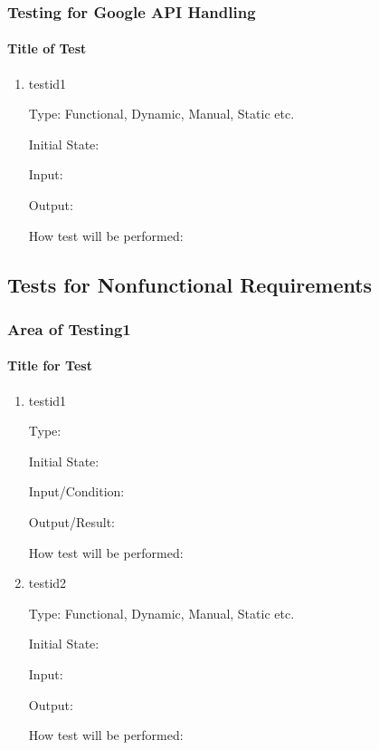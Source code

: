 \documentclass[12pt, titlepage]{article}
\begin{document}
\subsubsection{Testing for Google API Handling}

\paragraph{Title of Test}

\begin{enumerate}

\item{testid1\\}

Type: Functional, Dynamic, Manual, Static etc.
					
Initial State: 
					
Input: 
					
Output: 
					
How test will be performed: 
\end{enumerate}


\subsection{Tests for Nonfunctional Requirements}

\subsubsection{Area of Testing1}
		
\paragraph{Title for Test}

\begin{enumerate}

\item{testid1\\}

Type: 
					
Initial State: 
					
Input/Condition: 
					
Output/Result: 
					
How test will be performed: 
					
\item{testid2\\}

Type: Functional, Dynamic, Manual, Static etc.
					
Initial State: 
					
Input: 
					
Output: 
					
How test will be performed: 

\end{enumerate}
\end{document}

